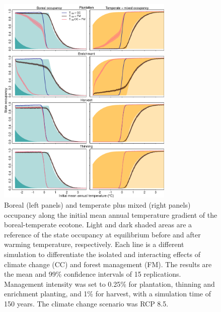 \hypertarget{fig:sim-result-supp6_ch1}{%
\begin{figure}
\centering
\includegraphics[width=0.75\textwidth,height=\textheight]{manuscript/img/sim-result_RCP8.5.png}
\caption[{Boreal (left panels) and temperate plus mixed (right panels)
occupancy along the initial mean annual temperature gradient of the
boreal-temperate ecotone.}]{Boreal (left panels) and temperate plus
mixed (right panels) occupancy along the initial mean annual temperature
gradient of the boreal-temperate ecotone. Light and dark shaded areas
are a reference of the state occupancy at equilibrium before and after
warming temperature, respectively. Each line is a different simulation
to differentiate the isolated and interacting effects of climate change
(CC) and forest management (FM). The results are the mean and 99\%
confidence intervals of 15 replications. Management intensity was set to
0.25\% for plantation, thinning and enrichment planting, and 1\% for
harvest, with a simulation time of 150 years. The climate change
scenario was RCP 8.5.}
\label{fig:sim-result-supp6_ch1}
\end{figure}
}

\newpage


